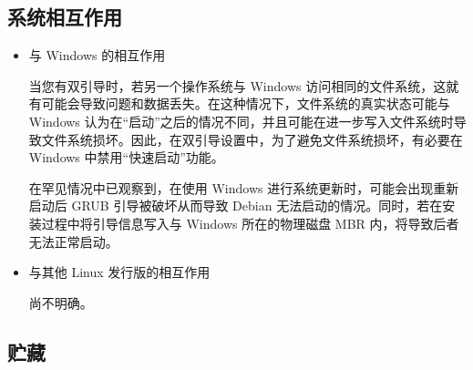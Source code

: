 \documentclass{article}
\begin{document}
\begin{multicols*}{3}








	\begin{tcolorbox}
	\section*{系统相互作用}
	\end{tcolorbox}
	\begin{itemize}[leftmargin=*]
		\setlength{\parindent}{0pt}

		\item 与 Windows 的相互作用

		当您有双引导时，若另一个操作系统与 Windows 访问相同的文件系统，这就有可能会导致问题和数据丢失。在这种情况下，文件系统的真实状态可能与 Windows 认为在“启动”之后的情况不同，并且可能在进一步写入文件系统时导致文件系统损坏。因此，在双引导设置中，为了避免文件系统损坏，有必要在 Windows 中禁用“快速启动”功能。

		在罕见情况中已观察到，在使用 Windows 进行系统更新时，可能会出现重新启动后 GRUB 引导被破坏从而导致 Debian 无法启动的情况。同时，若在安装过程中将引导信息写入与 Windows 所在的物理磁盘 MBR 内，将导致后者无法正常启动。

		\item 与其他 Linux 发行版的相互作用

		尚不明确。

	\end{itemize}


	\begin{tcolorbox}
	\section*{贮藏}
	\end{tcolorbox}


\end{multicols*}
\end{document}

